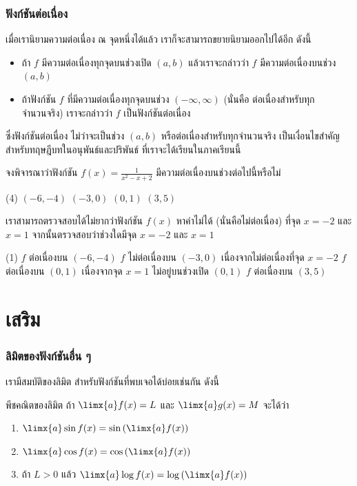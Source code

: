 \begin{frame}
\frametitle{ฟังก์ชันต่อเนื่อง}
เมื่อเรานิยามความต่อเนื่อง ณ จุดหนึ่งได้แล้ว \pa เราก็จะสามารถขยายนิยามออกไปได้อีก \pa ดังนี้
\begin{defn}{}{}
\begin{itemize}
\item ถ้า $f$  มีความต่อเนื่องทุกจุดบนช่วงเปิด $(a,b)$  แล้วเราจะกล่าวว่า $f$  มีความต่อเนื่องบนช่วง $(a,b)$  \pa
\item ถ้าฟังก์ชัน $f$  ที่มีความต่อเนื่องทุกจุดบนช่วง $(-\infty, \infty)$ (นั่นคือ ต่อเนื่องสำหรับทุกจำนวนจริง) เราจะกล่าวว่า $f$  เป็นฟังก์ชันต่อเนื่อง \pa
\end{itemize}
\end{defn}
ซึ่งฟังก์ชันต่อเนื่อง ไม่ว่าจะเป็นช่วง $(a,b)$ หรือต่อเนื่องสำหรับทุกจำนวนจริง เป็นเงื่อนไขสำคัญสำหรับทฤษฎีบทในอนุพันธ์และปริพันธ์ ที่เราจะได้เรียนในภาคเรียนนี้
\end{frame}


\begin{frame}[t]
\begin{ex}
จงพิจารณาว่าฟังก์ชัน $f(x) = \frac{1}{x^2-x+2}$ มีความต่อเนื่องบนช่วงต่อไปนี้หรือไม่
\begin{tasks}(4)
\task $(-6,-4)$
\task $(-3, 0)$
\task $(0,1)$
\task $(3,5)$
\end{tasks}
\end{ex}
\begin{sol}
เราสามารถตรวจสอบได้ไม่ยากว่าฟังก์ชัน $f(x)$ หาค่าไม่ได้ (นั่นคือไม่ต่อเนื่อง) ที่จุด \pa $x = -2$ และ $x=1$ \pa จากนั้นตรวจสอบว่าช่วงใดมีจุด $x=-2$ และ $x=1$\pa
\begin{tasks}(1)
\task $f$ ต่อเนื่องบน $(-6,-4)$ \pa
\task $f$ ไม่ต่อเนื่องบน $(-3,0)$ เนื่องจากไม่ต่อเนื่องที่จุด \pa $x=-2$ \pa
\task $f$ ต่อเนื่องบน $(0,1)$ \pa เนื่องจากจุด $x=1$ ไม่อยู่บนช่วงเปิด $(0,1)$ \pa
\task $f$ ต่อเนื่องบน $(3,5)$
\end{tasks}
\end{sol}
\end{frame}

\section{เสริม}
\frame{\sectionpage}


\begin{frame}
\frametitle{ลิมิตของฟังก์ชันอื่น ๆ}
เรามีสมบัติของลิมิต สำหรับฟังก์ชันที่พบเจอได้บ่อยเช่นกัน ดังนี้
\begin{prop}{พีชคณิตของลิมิต}{}
ถ้า $\limx{a} f(x) = L$ และ $\limx{a} g(x) = M$ จะได้ว่า \pa
\begin{enumerate}
\item $\limx{a} \sin f(x) = \sin \left(\limx{a} f(x)\right)$ \pa
\item $\limx{a} \cos f(x) = \cos \left(\limx{a} f(x)\right)$ \pa
\item ถ้า $L>0$ แล้ว $\limx{a} \log f(x) = \log \left(\limx{a} f(x)\right)$ \pa
\end{enumerate}
\end{prop}
\end{frame}

